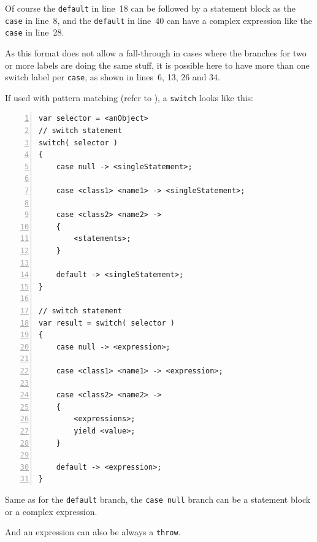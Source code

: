 \documentclass[11pt,a4paper, titlepage, parskip=half, headsepline, footsepline, cleardoublepage=current, headheight=1cm]{scrbook}
\begin{document}
Of course the \lstinline|default| in line~18 can be followed by a statement block as the \lstinline|case| in line~8, and the \lstinline|default| in line~40 can have a complex expression like the \lstinline|case| in line~28.

As this format does not allow a fall-through in cases where the branches for two or more labels are doing the same stuff, it is possible here to have more than one switch label per \lstinline|case|, as shown in lines~6, 13, 26 and 34.

If used with pattern matching (refer to \autocite{ORACLE_DOC_PATTERNMATCHING}), a \lstinline|switch| looks like this:
\begin{lstlisting}[numbers=left]
var selector = <anObject>
// switch statement
switch( selector )
{
    case null -> <singleStatement>;
    
    case <class1> <name1> -> <singleStatement>;

    case <class2> <name2> ->
    {
        <statements>;
    }

    default -> <singleStatement>;
}

// switch statement
var result = switch( selector )
{
    case null -> <expression>;

    case <class1> <name1> -> <expression>;

    case <class2> <name2> ->
    {
        <expressions>;
        yield <value>;
    }

    default -> <expression>;
}
\end{lstlisting}

Same as for the \lstinline|default| branch, the \lstinline|case null| branch can be a statement block or a complex expression.

And an expression can also be always a \lstinline|throw|.
\end{document}
